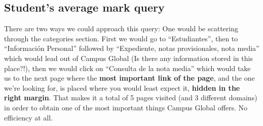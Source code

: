 \documentclass{article}
\begin{document}
\subsection{Student’s average mark query}
There are two ways we could approach this query:
One would be scattering through the categories section. First we would go to “Estudiantes”, then to “Información Personal” followed by “Expediente, notas provisionales, nota media” which would lead out of Campus Global (Is there any information stored in this place?!), then we would click on “Consulta de la nota media” which would take us to the next page where the \textbf{most important link of the page}, and the one we’re looking for, is placed where you would least expect it, \textbf{hidden in the right margin}. That makes it a total of 5 pages visited (and 3 different domains) in order to obtain one of the most important things Campus Global offers. No efficiency at all.
\end{document}
